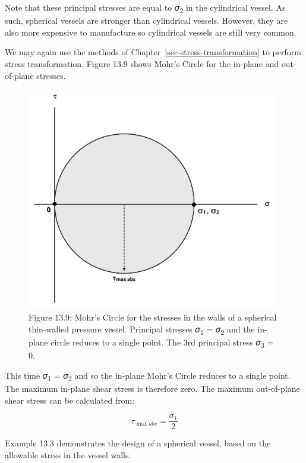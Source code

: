 \documentclass[
  letterpaper,
  DIV=11,
  numbers=noendperiod]{scrreprt}
\theoremstyle{definition}
\theoremstyle{remark}
\begin{document}
Note that these principal stresses are equal to 𝜎\textsubscript{2} in
the cylindrical vessel. As such, spherical vessels are stronger than
cylindrical vessels. However, they are also more expensive to
manufacture so cylindrical vessels are still very common.

We may again use the methods of Chapter~\ref{sec-stress-transformation}
to perform stress transformation. Figure 13.9 shows Mohr's Circle for
the in-plane and out-of-plane stresses.

\begin{figure}[H]

{\centering \includegraphics[width=4.35417in,height=\textheight]{images/CH13 PNGs/figure 13.9.png}

}

\caption{Figure 13.9: Mohr's Circle for the stresses in the walls of a
spherical thin-walled pressure vessel. Principal stresses
𝜎\textsubscript{1} = 𝜎\textsubscript{2} and the in-plane circle reduces
to a single point. The 3rd principal stress 𝜎\textsubscript{3} = 0.}

\end{figure}%

This time 𝜎\textsubscript{1} = 𝜎\textsubscript{2} and so the in-plane
Mohr's Circle reduces to a single point. The maximum in-plane shear
stress is therefore zero. The maximum out-of-plane shear stress can be
calculated from:

\[
\tau_{\max a b s}=\frac{\sigma_1}{2}
\]

Example 13.3 demonstrates the design of a spherical vessel, based on the
allowable stress in the vessel walls.
\end{document}
